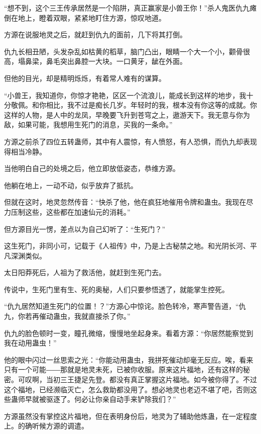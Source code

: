 
\begin{this_body}

“想不到，这个三王传承居然是一个陷阱，真正赢家是小兽王你！”杀人鬼医仇九瘫倒在地上，瞪着双眼，紧紧地盯住方源，惊叹地道。

方源在说服地灵之后，就赶到仇九的面前，几下将其打倒。

仇九长相丑陋，头发杂乱如枯黄的稻草，脑门凸出，眼睛一个大一个小，颧骨很高，塌鼻梁，鼻毛突出鼻腔一大块。一口黄牙，龇在外面。

但他的目光，却是精明烁烁，有着常人难有的谋算。

“小兽王，我知道你，你惊才艳艳，区区一个流浪儿，能成长到这样的地步，我十分敬佩。和你相比，我不过是痴长几岁。年轻时的我，根本没有你这等的成就。你这样的人物，是人中的龙凤，早晚要飞升到苍穹之上，遨游天下。我无意与你为敌，如果可能，我想用生死门的消息，买我的一条命。”

方源之前杀了四位五转蛊师，其中有人震惊，有人愤怒，有人恐惧，而仇九却表现得相当冷静。

当他明白自己的处境之后，他立即放低姿态，恭维方源。

他躺在地上，一动不动，似乎放弃了抵抗。

但就在这时，地灵忽然传音：“快杀了他，他在疯狂地催用令牌和蛊虫。我现在尽力压制这些，这些都在加速仙元的消耗。”

但方源目光一愣，差点以为自己幻听了：“生死门？”

这生死门，非同小可，记载于《人祖传》中，乃是上古秘禁之地。和光阴长河、平凡深渊类似。

太日阳莽死后，人祖为了救活他，就赶到生死门去。

传说中，生死门里有生、死的奥秘，人们只要参悟透了，就能掌生控死。

“仇九居然知道生死门的位置！？”方源心中惊诧。脸色转冷，寒声警告道，“仇九，你若再催动蛊虫，我就直接杀了你。”

仇九的脸色顿时一变，瞳孔微缩，慢慢地坐起身来。看着方源：“你居然能察觉到我在动用蛊虫！”

他的眼中闪过一丝思索之光：“你能动用蛊虫，我拼死催动却毫无反应。唉，看来只有一个可能――那就是地灵未死，已被你收服。原来这片福地，还有这样的秘密。可叹啊，当初三王捷足先登。都没有真正掌握这片福地。如今被你得了。不过这个福地，已经濒临灭亡，怎么救助都没用了。想必地灵也老迈不堪了吧，否则这些蛊师早就被驱逐了。何必让你亲自动手来铲除我们？”

方源虽然没有掌控这片福地，但在表明身份后，地灵为了辅助他炼蛊，在一定程度上。的确听候方源的调遣。


\end{this_body}
